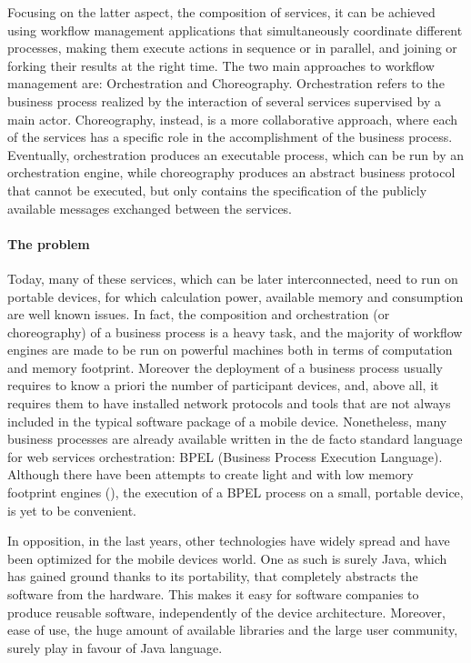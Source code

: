 Focusing on the latter aspect, the composition of services, it can be achieved using workflow management applications that simultaneously coordinate different processes, making them execute actions in sequence or in parallel, and joining or forking their results at the right time. %
The two main approaches to workflow management are: Orchestration and Choreography.
Orchestration refers to the %
business process realized by the interaction of several services supervised by a main actor. Choreography, instead, is a more collaborative approach, where each of the services has a specific role in the accomplishment of the business process. Eventually, orchestration produces an executable process, which can be run by an orchestration engine, while choreography produces an abstract business protocol that cannot be executed, but only contains the specification of the publicly available messages exchanged between the services.

\paragraph{The problem}
Today, many of these services, which can be later interconnected, need to run on portable devices, for which calculation power, available memory and consumption are well known issues. In fact, the composition and orchestration (or choreography) of a business process is a heavy task, and the majority of workflow engines are made to be run on powerful machines both in terms of computation and memory footprint. Moreover the deployment of a business process usually requires to know a priori the number of participant devices, and, above all, it requires them to have installed network protocols and tools that are not always included in the typical software package of a mobile device. 
Nonetheless, many business processes are already available written in the de facto standard language for web services orchestration: BPEL (Business Process Execution Language). Although there have been attempts to create light and with low memory footprint engines (\cite{bpelMobileEngineMora,bpelMobileEngineHackmann06sliver:a}), the execution of a BPEL process on a small, portable device, is yet to be convenient.

In opposition, in the last years, other technologies have widely spread and have been optimized for the mobile devices world. One as such is surely Java, which has gained ground thanks to its portability, that completely abstracts the software from the hardware. This makes it easy for software companies to produce reusable software, independently of the device architecture. Moreover, ease of use, the huge amount of available libraries and the large user community, surely play in favour of Java language. 

